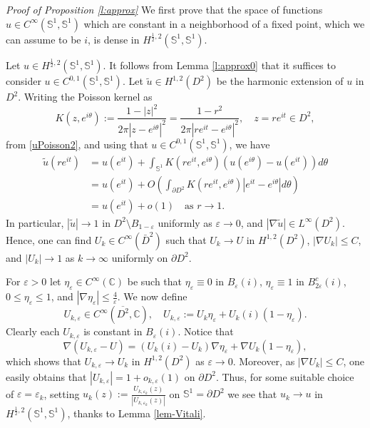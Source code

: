 \documentclass[12pt, a4paper]{article}
\newcommand{\sph}{\mathbb{S}}
\newcommand{\ve}{\varepsilon}
\renewcommand{\(}{\left(}
\renewcommand{\)}{\right)}
\begin{document}
\noindent\emph{Proof of Proposition \ref{l:approx}} We first prove that the space of functions $u\in C^\infty(\sph^1,\sph^1) $  which are constant in a neighborhood of a fixed point, which we can assume to be $i$, is dense in $H^{\frac{1}{2},2}(\sph^1,\sph^1)$.  

Let $u\in H^{\frac{1}{2},2}(\sph^1,\sph^1)$. It follows from Lemma \ref{l:approx0} that it suffices to consider $u\in C^{0,1}(\sph^1,\sph^1)$. Let $\tilde u\in H^{1,2}(D^2)$ be the harmonic extension of $u$ in $D^2$. Writing the Poisson kernel as 
$$K(z,e^{i\theta}):=\frac{1-|z|^2}{2\pi |z-e^{i\theta}|^2}=\frac{1-r^2}{2\pi |re^{it}-e^{i\theta}|^2},\quad z=re^{it}\in D^2,$$
from \eqref{uPoisson2}, and using that $u\in C^{0,1}(\sph^1,\sph^1)$, we have
\[\begin{split}
\tilde u(re^{it})&=u(e^{it})+\int_{\sph^1}K(re^{it},e^{i\theta})\left(u(e^{i\theta})-u(e^{it})\right)d\theta\\
&=u(e^{it})+O\left(\int_{\partial D^2}K(re^{it},e^{i\theta})|e^{it}-e^{i\theta}|d\theta\right)\\
&=u(e^{it})+o(1)\quad \text{as }r\to 1.
\end{split}\]
In particular, $|\tilde u|\to 1$ in $D^2\setminus B_{1-\ve}$ uniformly as $\ve\to 0$, and $|\nabla \tilde u|\in L^\infty(D^2)$. Hence, one can find $U_k\in C^\infty(\bar D^2)$ such that $U_k\to U$ in $H^{1,2}(D^2)$, $|\nabla U_k|\leq C$, and $|U_k|\to 1$ as $k\to \infty$ uniformly on $\partial D^2$. 

For $\ve>0$ let $\eta_\ve\in C^\infty(\mathbb{C})$ be such that $\eta_\ve\equiv 0$ in $B_\ve (i)$, $\eta_\ve\equiv 1$ in $B^c_{2\ve}(i)$, $0\leq\eta_\ve\leq1$, and $|\nabla \eta_\ve|\leq\frac{4}{\ve}$. We now define
$$U_{k,\ve}\in C^\infty(\overline{D^2},\mathbb{C}), \quad U_{k,\ve}:=U_k\eta_\ve+U_k(i)(1-\eta_\ve).$$ Clearly each $U_{k,\ve}$ is constant in $B_\ve(i)$. Notice that
$$\nabla (U_{k,\ve}-U)=(U_k(i)-U_k)\nabla \eta_\ve+\nabla U_k(1-\eta_\ve),$$ which shows that $U_{k,\ve}\to U_k$ in $H^{1,2}(D^2)$ as $\ve\to0$. Moreover, as $|\nabla U_k|\leq C$, one easily obtains that $|U_{k,\ve}|=1+o_{k,\ve}(1)$ on $\partial D^2$. Thus, for some suitable choice of $\ve=\ve_k$, setting $u_k(z):=\frac{U_{k,\ve_k}(z)}{|U_{k,\ve_k}(z)|}$ on $\sph^1=\partial D^2$ we see that $u_k\to u$ in $H^{\frac{1}{2},2}(\sph^1,\sph^1)$, thanks to Lemma \ref{lem-Vitali}. 
\end{document}
